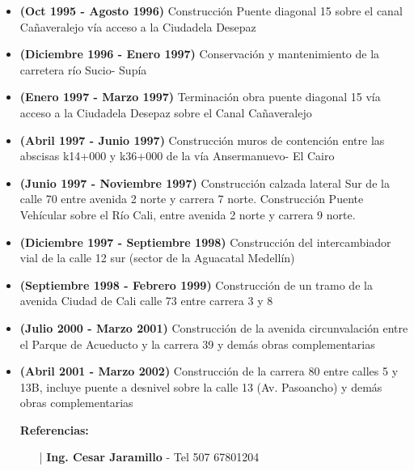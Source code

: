 \documentclass[letterpaper,10pt]{article}
\begin{document}
\begin{minipage}{\linewidth}
\begin{itemize}[noitemsep]
      \item \textbf{(Oct 1995 - Agosto 1996)} Construcción Puente diagonal 15 sobre el canal Cañaveralejo vía acceso a la Ciudadela Desepaz
      \item \textbf{(Diciembre 1996 - Enero 1997)} Conservación y mantenimiento de la carretera río Sucio- Supía
      \item \textbf{(Enero 1997 - Marzo 1997)} Terminación obra puente diagonal 15 vía acceso a la Ciudadela Desepaz sobre el Canal Cañaveralejo
      \item \textbf{(Abril 1997 - Junio 1997)} Construcción muros de contención entre las abscisas k14+000 y k36+000 de la vía Ansermanuevo- El Cairo
      \item \textbf{(Junio 1997 - Noviembre 1997)} Construcción calzada lateral Sur de la calle 70 entre avenida 2 norte y carrera 7 norte. Construcción Puente Vehícular sobre el Río Cali, entre avenida 2 norte y carrera 9 norte.
      \item \textbf{(Diciembre 1997 - Septiembre 1998)} Construcción del intercambiador vial de la calle 12 sur (sector de la Aguacatal Medellín)
      \item \textbf{(Septiembre 1998 - Febrero 1999)} Construcción de un tramo de la avenida Ciudad de Cali calle 73 entre carrera 3 y 8
      \item \textbf{(Julio 2000 - Marzo 2001)} Construcción de la avenida circunvalación entre el Parque de Acueducto y la carrera 39 y demás obras complementarias
      \item \textbf{(Abril 2001 - Marzo 2002)} Construcción de la carrera 80 entre calles 5 y 13B, incluye puente a desnivel sobre la calle 13 (Av. Pasoancho) y demás obras complementarias
      \item [] \textbf{Referencias:}
      \begin{itemize}[noitemsep]
        \vspace*{-0.2cm}
        \item [|] \textbf{Ing. Cesar Jaramillo} - Tel 507 67801204
      \end{itemize}
    \end{itemize}
    \hfill
  \end{minipage}
  
  \newpage
\end{document}
